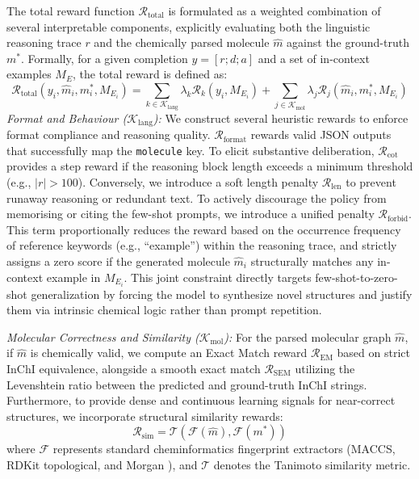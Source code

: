 \documentclass[11pt]{article}
\begin{document}
The total reward function $\mathcal{R}_{\text{total}}$ is formulated as a weighted combination of several interpretable components, explicitly evaluating both the linguistic reasoning trace $r$ and the chemically parsed molecule $\hat{m}$ against the ground-truth $m^*$. Formally, for a given completion $y = [r; d; a]$ and a set of in-context examples $M_{E}$, the total reward is defined as:
\begin{equation}
\mathcal{R}_{\text{total}}(y_i, \hat{m}_i, m_i^*, M_{E_i}) = \sum\limits_{k \in \mathcal{K}_{\text{lang}}} \lambda_k \mathcal{R}_k(y_i, M_{E_i}) + \sum\limits_{j \in \mathcal{K}_{\text{mol}}} \lambda_j \mathcal{R}_j(\hat{m}_i, m_i^*, M_{E_i})
\label{eq:reward_total}
\end{equation}
\emph{Format and Behaviour ($\mathcal{K}_{\text{lang}}$):} We construct several heuristic rewards to enforce format compliance and reasoning quality. $\mathcal{R}_{\text{format}}$ rewards valid JSON outputs that successfully map the \texttt{molecule} key. To elicit substantive deliberation, $\mathcal{R}_{\text{cot}}$ provides a step reward if the reasoning block length exceeds a minimum threshold (e.g., $|r| > 100$). Conversely, we introduce a soft length penalty $\mathcal{R}_{\text{len}}$ to prevent runaway reasoning or redundant text. To actively discourage the policy from memorising or citing the few-shot prompts, we introduce a unified penalty $\mathcal{R}_{\text{forbid}}$. This term proportionally reduces the reward based on the occurrence frequency of reference keywords (e.g., ``example'') within the reasoning trace, and strictly assigns a zero score if the generated molecule $\hat{m}_i$ structurally matches any in-context example in $M_{E_i}$. This joint constraint directly targets few-shot-to-zero-shot generalization by forcing the model to synthesize novel structures and justify them via intrinsic chemical logic rather than prompt repetition.

\emph{Molecular Correctness and Similarity ($\mathcal{K}_{\text{mol}}$):} For the parsed molecular graph $\hat{m}$, if $\hat{m}$ is chemically valid, we compute an Exact Match reward $\mathcal{R}_{\text{EM}}$ based on strict InChI equivalence, alongside a smooth exact match $\mathcal{R}_{\text{SEM}}$ utilizing the Levenshtein ratio between the predicted and ground-truth InChI strings. Furthermore, to provide dense and continuous learning signals for near-correct structures, we incorporate structural similarity rewards:
\begin{equation}
\mathcal{R}_{\text{sim}} = \mathcal{T}(\mathcal{F}(\hat{m}), \mathcal{F}(m^*))
\end{equation}
where $\mathcal{F}$ represents standard cheminformatics fingerprint extractors (MACCS, RDKit topological, and Morgan \cite{rdkit,preuer2018fcd}), and $\mathcal{T}$ denotes the Tanimoto similarity metric. 
\end{document}

